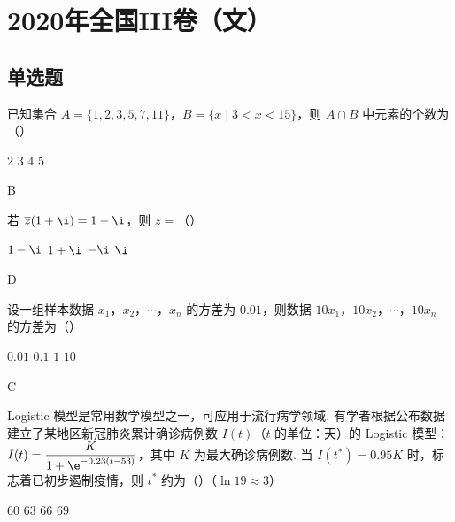 \chapter{2020年全国III卷（文）}

\section{单选题}

\begin{problem}
已知集合 \(A=\{1,2,3,5,7,11\}\)，\(B=\{x\mid 3<x<15\}\)，则 \(A\cap B\) 中元素的个数为（\quad）

\choices
    {\(2\)}
    {\(3\)}
    {\(4\)}
    {\(5\)}
\end{problem}

\begin{answer}
B
\end{answer}



\begin{problem}
若 \(\overline{z}(1+\i)=1-\i\)，则 \(z=\)（\quad）

\choices
    {\(1-\i\)}
    {\(1+\i\)}
    {\(-\i\)}
    {\(\i\)}
\end{problem}

\begin{answer}
D
\end{answer}



\begin{problem}
设一组样本数据 \(x_1\)，\(x_2\)，\(\cdots\)，\(x_n\) 的方差为 \(0.01\)，则数据 \(10x_1\)，\(10x_2\)，\(\cdots\)，\(10x_n\) 的方差为（\quad）

\choices
    {\(0.01\)}
    {\(0.1\)}
    {\(1\)}
    {\(10\)}
\end{problem}

\begin{answer}
C
\end{answer}



\begin{problem}
Logistic 模型是常用数学模型之一，可应用于流行病学领域. 有学者根据公布数据建立了某地区新冠肺炎累计确诊病例数 \(I(t)\)（\(t\) 的单位：天）的 Logistic 模型：\(I(t)=\dfrac{K}{1+\e^{-0.23(t-53)}}\)，其中 \(K\) 为最大确诊病例数. 当 \(I(t^*)=0.95K\) 时，标志着已初步遏制疫情，则 \(t^*\) 约为（\quad）（\(\ln 19\approx 3\)）

\choices
    {\(60\)}
    {\(63\)}
    {\(66\)}
    {\(69\)}
\end{problem}

